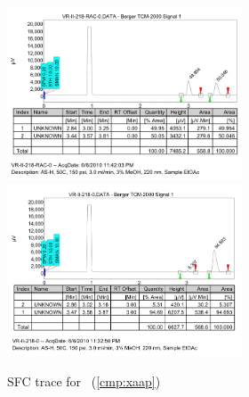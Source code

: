 \begin{figure}[h]
\centering
\includegraphics[width=2.75in]{chp_asymmetric/images/sfc/xaap-rac.png}
\includegraphics[width=2.75in]{chp_asymmetric/images/sfc/xaap.png}
\caption{SFC trace for \CMPxaap~(\ref{cmp:xaap})}
\vspace{-10pt}
\end{figure}

